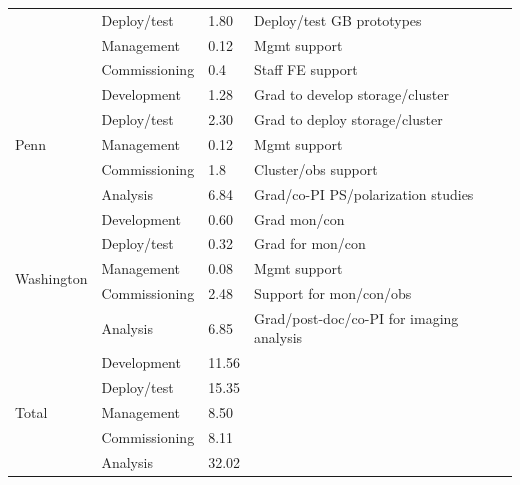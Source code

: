 \documentclass[preprint]{aastex}
\begin{document}
\begin{table}[th]
\begin{tabular}{| p{1in} | p{1in} | p{0.5in} | p{3in} |}
                                                & Deploy/test   & 1.80  & Deploy/test GB prototypes \\ 
                                                & Management  & 0.12  & Mgmt support\\ 
                                                & Commissioning & 0.4 & Staff FE support \\ \hline
\multirow{5}{*}{Penn}              & Development & 1.28 & Grad to develop storage/cluster \\ 
                                                & Deploy/test   & 2.30  & Grad to deploy storage/cluster\\
                                                & Management  &  0.12 & Mgmt support \\ 
                                                & Commissioning & 1.8 & Cluster/obs support \\
                                                & Analysis         & 6.84 & Grad/co-PI PS/polarization studies \\  \hline
\multirow{5}{*}{Washington} & Development & 0.60 & Grad mon/con \\
                                                & Deploy/test   & 0.32 & Grad for mon/con \\ 
                                                & Management  &  0.08 & Mgmt support \\ 
                                                & Commissioning     & 2.48 & Support for mon/con/obs \\
                                                & Analysis         & 6.85 & Grad/post-doc/co-PI for imaging analysis \\  \hline
\multirow{5}{*}{Total} & Development & 11.56 &  \\
                                                & Deploy/test   & 15.35 &  \\ 
                                                & Management  &  8.50 &  \\ 
                                                & Commissioning   & 8.11 &  \\
                                                & Analysis         & 32.02 &  \\ \hline
\end{tabular}
\end{table}
\end{document}
